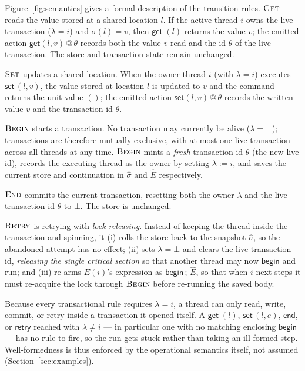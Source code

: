 \documentclass[manuscript,nonacm]{acmart}
\makeatletter
\theoremstyle{acmdefinition}
\newcommand{\unit}{()}
\newcommand{\bbegin}{\textsf{begin}}
\newcommand{\eend}{\textsf{end}}
\newcommand{\retry}{\textsf{retry}}
\newcommand{\getc}[1]{\textsf{get}\;(#1)}
\newcommand{\setc}[2]{\textsf{set}\,(#1,#2)}
\newcommand{\getev}[3]{\textsf{get}(#1,#2)\,@\,#3}
\newcommand{\setev}[3]{\textsf{set}(#1,#2)\,@\,#3}
\makeatother
\begin{document}
Figure~\ref{fig:semantics} gives a formal description of the transition
rules. $\textrm{\sc{Get}}$ reads the value stored at a shared location
$l$. If the active thread $i$ owns the live transaction ($\lambda = i$) and $\sigma(l)=v$, then $\getc{l}$ returns the value $v$; the emitted action $\getev{l}{v}{\theta}$ records both the value $v$ read and the id $\theta$ of the live transaction. The store and transaction state remain unchanged.

$\textrm{\sc{Set}}$ updates a shared location. When the owner thread $i$ (with $\lambda = i$) executes
$\setc{l}{v}$, the value stored at location $l$ is updated to $v$ and the
command returns the unit value $\unit$; the emitted action $\setev{l}{v}{\theta}$ records the written value $v$ and the transaction id $\theta$.

$\textrm{\sc{Begin}}$ starts a transaction. No transaction may currently be alive ($\lambda = \bot$); transactions are therefore mutually exclusive, with at most one live transaction across all threads at any time. $\textrm{\sc{Begin}}$ mints a \emph{fresh} transaction id $\theta$ (the new live id), records the executing thread as the owner by setting $\lambda := i$, and saves the current store and continuation in $\hat{\sigma}$ and $\hat{E}$ respectively.

$\textsc{End}$ commits the current transaction, resetting both the owner $\lambda$ and the live transaction id $\theta$ to $\bot$. The store is unchanged.


$\textsc{Retry}$ is retrying with \emph{lock-releasing}. Instead of keeping the thread inside the transaction and spinning, it (i) rolls the store back to the snapshot $\hat{\sigma}$, so the abandoned attempt has no effect; (ii) sets $\lambda=\bot$ and clears the live transaction id, \emph{releasing the single critical section} so that another thread may now $\bbegin$ and run; and (iii) re-arms $E(i)$'s expression as $\bbegin\,;\,\hat{E}$, so that when $i$ next steps it must re-acquire the lock through $\textsc{Begin}$ before re-running the saved body.

Because every transactional rule requires $\lambda = i$, a thread can only read, write, commit, or retry inside a transaction it opened itself. A $\getc{l}$, $\setc{l}{e}$, $\eend$, or $\retry$ reached with $\lambda \neq i$ --- in particular one with no matching enclosing $\bbegin$ --- has no rule to fire, so the run gets stuck rather than taking an ill-formed step. Well-formedness is thus enforced by the operational semantics itself, not assumed (Section~\ref{sec:examples}).
\end{document}
